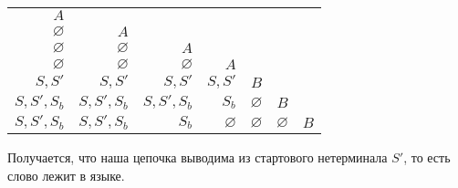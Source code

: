 \documentclass[12pt]{article}
\newenvironment{Problems}{
	\begin{enumerate}[]
	}{       
	\end{enumerate}
}
\begin{document}
\begin{Problems}
	\begin{center}
		\begin{tabular}{|r|r|r|r|r|r|r|}
			\cline{1-1}
			$A$\\
			\cline{1-2}
			$\varnothing$ & $A$\\
			\cline{1-3}
			$\varnothing$ & $\varnothing$ & $A$\\
			\cline{1-4}
			$\varnothing$ & $\varnothing$ & $\varnothing$ & $A$\\
			\cline{1-5}
			$S, S'$ & $S, S'$ & $S, S'$ & $S, S'$ & $B$\\
			\cline{1-6}
			$S, S', S_b$ & $S, S', S_b$ & $S, S', S_b$ & $S_b$ & $\varnothing$ & $B$\\
			\hline
			$S, S', S_b$ & $S, S', S_b$ & $S_b$ & $\varnothing$ & $\varnothing$ & $\varnothing$ & $B$\\
			\hline
		\end{tabular}
	\end{center}
	Получается, что наша цепочка выводима из стартового нетерминала $S'$, то есть слово лежит в языке.\\
	

\end{Problems}
\end{document}

